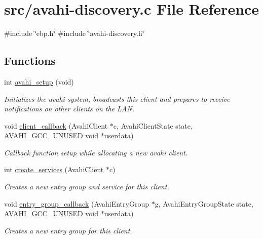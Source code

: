 \hypertarget{avahi-discovery_8c}{\section{src/avahi-\/discovery.c \-File \-Reference}
\label{avahi-discovery_8c}
}
{\ttfamily \#include \char`\"{}ebp.\-h\char`\"{}}\*
{\ttfamily \#include \char`\"{}avahi-\/discovery.\-h\char`\"{}}\*
\subsection*{\-Functions}
\begin{DoxyCompactItemize}
\item 
int \hyperlink{avahi-discovery_8c_ab6b27b0e371ca0b376eb974f375ff5ca}{avahi\-\_\-setup} (void)
\begin{DoxyCompactList}\small\item\em \-Initializes the avahi system, broadcasts this client and prepares to receive notifications on other clients on the \-L\-A\-N. \end{DoxyCompactList}\item 
void \hyperlink{avahi-discovery_8c_a5737f6f987251a326e517df2e46798e2}{client\-\_\-callback} (\-Avahi\-Client $\ast$c, \-Avahi\-Client\-State state, \-A\-V\-A\-H\-I\-\_\-\-G\-C\-C\-\_\-\-U\-N\-U\-S\-E\-D void $\ast$userdata)
\begin{DoxyCompactList}\small\item\em \-Callback function setup while allocating a new avahi client. \end{DoxyCompactList}\item 
int \hyperlink{avahi-discovery_8c_a9ba82854f49f859a54be8e85a44adebf}{create\-\_\-services} (\-Avahi\-Client $\ast$c)
\begin{DoxyCompactList}\small\item\em \-Creates a new entry group and service for this client. \end{DoxyCompactList}\item 
void \hyperlink{avahi-discovery_8c_a06c4f33a522276419bbfe69fe8c64b34}{entry\-\_\-group\-\_\-callback} (\-Avahi\-Entry\-Group $\ast$g, \-Avahi\-Entry\-Group\-State state, \-A\-V\-A\-H\-I\-\_\-\-G\-C\-C\-\_\-\-U\-N\-U\-S\-E\-D void $\ast$userdata)
\begin{DoxyCompactList}\small\item\em \-Creates a new entry group for this client. \end{DoxyCompactList}\item 

\end{DoxyCompactItemize}
